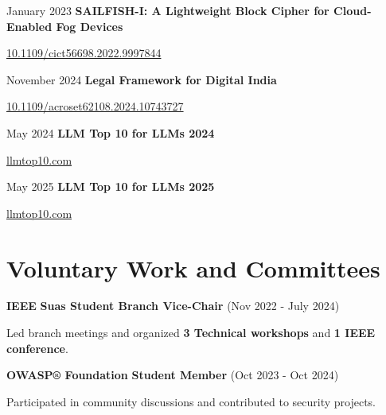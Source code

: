 \documentclass[10pt, A4]{article}
\begin{document}
	\begin{samepage}
		\begin{twocolentry}{
			January 2023 
			}
			\textbf{SAILFISH-I: A Lightweight Block Cipher for Cloud-Enabled Fog Devices}

			\href{https://doi.org/10.1109/cict56698.2022.9997844}{10.1109/cict56698.2022.9997844}
		\end{twocolentry}
			
		\vspace{0.1 cm}
			
		\begin{twocolentry}{
			November 2024
			}
			\textbf{Legal Framework for Digital India}

			\href{https://doi.org/10.1109/acroset62108.2024.10743727}{10.1109/acroset62108.2024.10743727}
		\end{twocolentry}
			
		\vspace{0.1 cm}
			
		\begin{twocolentry}{
				May 2024 
			}
			\textbf{LLM Top 10 for LLMs 2024}

			\href{https://genaisecurityproject.com/resources/?e-filter-3b7adda-language=hindi}{llmtop10.com}
		\end{twocolentry}
			
		\vspace{0.1 cm}
			
		\begin{twocolentry}{
				May 2025 
			}
			\textbf{LLM Top 10 for LLMs 2025}

			\href{https://genaisecurityproject.com/resource/owasp-top-10-for-llm-applications-2025}{llmtop10.com}
		\end{twocolentry}
			
	\end{samepage}
	

	\section{Voluntary Work and Committees}

	\begin{twocolentry}{
		\textbf{IEEE}
	}
	\textbf{Suas Student Branch Vice-Chair} (Nov 2022 - July 2024)
	\begin{highlights}
		\item Led branch meetings and organized \textbf{3 Technical workshops} and \textbf{1 IEEE conference}.
	\end{highlights}

	\vspace{0.1 cm} 

\end{twocolentry}
	\begin{twocolentry}{
			\textbf{OWASP® Foundation}
		}
		\textbf{Student Member} (Oct 2023 - Oct 2024)
		\begin{highlights}
			\item Participated in community discussions and contributed to security projects.
		\end{highlights}
	\end{twocolentry}
	
\end{document}
